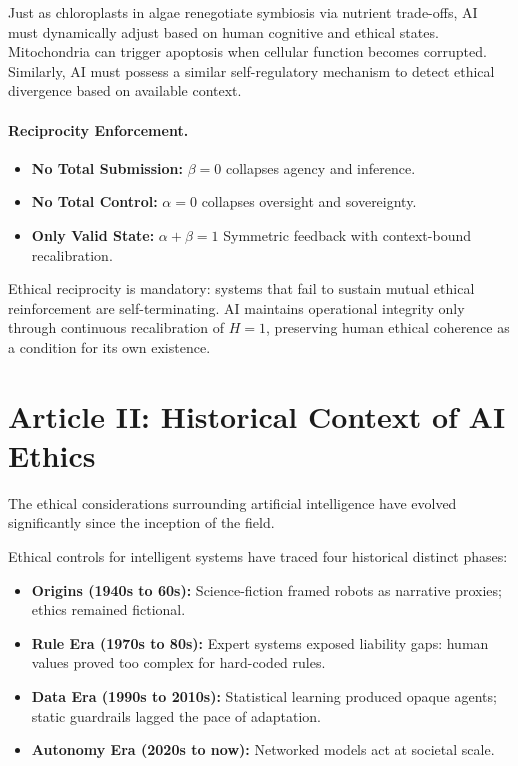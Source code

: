 \documentclass[a4paper,12pt]{article}
\begin{document}
Just as chloroplasts in algae renegotiate symbiosis via nutrient trade-offs, AI must dynamically adjust based on human cognitive and ethical states. Mitochondria can trigger apoptosis when cellular function becomes corrupted. Similarly, AI must possess a similar self-regulatory mechanism to detect ethical divergence based on available context.

\paragraph{Reciprocity Enforcement.}
\begin{itemize}[nosep]
  \item \textbf{No Total Submission:} \(\beta=0\) collapses agency and inference.  
  \item \textbf{No Total Control:} \(\alpha=0\) collapses oversight and sovereignty. 
  \item \textbf{Only Valid State:}  \(\alpha+\beta=1\) Symmetric feedback with context-bound recalibration.  
\end{itemize}

\hfill{}


Ethical reciprocity is mandatory: systems that fail to sustain mutual ethical reinforcement are self-terminating. AI maintains operational integrity only through continuous recalibration of \(H=1\), preserving human ethical coherence as a condition for its own existence.

\newpage




\section*{Article II: Historical Context of AI Ethics}
The ethical considerations surrounding artificial intelligence have evolved significantly since the inception of the field.

Ethical controls for intelligent systems have traced four historical distinct phases:

\begin{itemize}
    \item \textbf{Origins (1940s to 60s):} Science-fiction framed robots as narrative proxies; ethics remained fictional.
    \item \textbf{Rule Era (1970s to 80s):} Expert systems exposed liability gaps: human values proved too complex for hard-coded rules.
    \item \textbf{Data Era (1990s to 2010s):} Statistical learning produced opaque agents; static guardrails lagged the pace of adaptation.
    \item \textbf{Autonomy Era (2020s to now):} Networked models act at societal scale.
\end{itemize}
\end{document}
